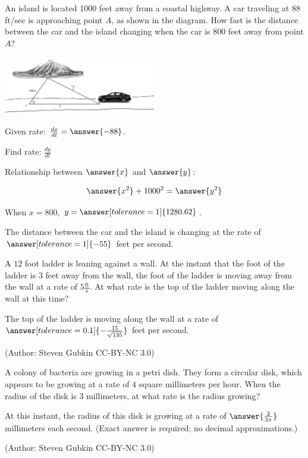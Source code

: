 \documentclass{ximera}
\begin{document}
 
 
 \begin{problem}\label{prob:240hom5prob2}
An island is located 1000 feet away from a coastal highway.  A car traveling at 88 ft/sec is approaching point $A$, as shown in the diagram.  How fast is the distance between the car and the island changing when the car is 800 feet away from point $A$?
\begin{image}
   
\includegraphics[height=1in]{Inkedtest2image4.jpg}~
 
\end{image}

Given rate: $\frac{dx}{dt}=\answer{-88}$.

Find rate:  $\frac{dy}{dt}$

Relationship between $\answer{x}$ and $\answer{y}$:

$$\answer{x^2}+1000^2=\answer{y^2}$$

When $x=800$, $y=\answer[tolerance=1]{1280.62}$.

The distance between the car and the island is changing at the rate of $\answer[tolerance=1]{-55}$ feet per second.
 \end{problem}
 
 \begin{problem}\label{prob:240hom5prob7}
 A $12$ foot ladder is leaning against a wall.  At the instant that the foot of the ladder is $3$ feet away from the wall, the foot of the ladder is moving away from the wall at a rate of $5 \frac{\textrm{ft}}{\textrm{s}}$.  At what rate is the top of the ladder moving along the wall at this time?

The top of the ladder is moving along the wall at a rate of $\answer[tolerance=0.1]{-\frac{15}{\sqrt{135}}}$ feet per second.

(Author: Steven Gubkin CC-BY-NC 3.0)
 \end{problem}
 
 \begin{problem}\label{prob:240hom5prob8}
 A colony of bacteria are growing in a petri dish.  They form a
circular disk, which appears to be growing at a rate of $4$ square
millimeters per hour.  When the radius of the disk is $3$ millimeters,
at what rate is the radius growing?

At this instant, the radius of this disk is growing at a rate
  of $\answer{\frac{2}{3\pi}}$ millimeters each second.  (Exact answer is required; no decimal approximations.)
  
 (Author: Steven Gubkin CC-BY-NC 3.0)
 \end{problem}
 

 
\end{document}
